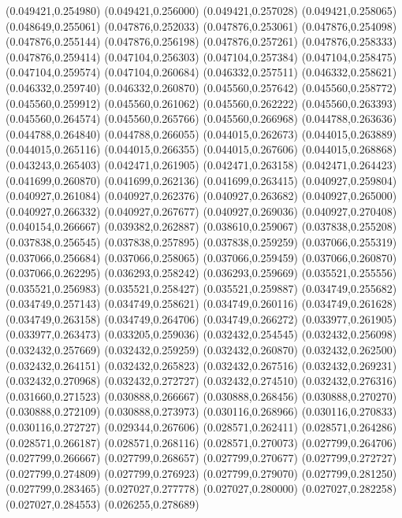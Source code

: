 (0.049421,0.254980)
(0.049421,0.256000)
(0.049421,0.257028)
(0.049421,0.258065)
(0.048649,0.255061)
(0.047876,0.252033)
(0.047876,0.253061)
(0.047876,0.254098)
(0.047876,0.255144)
(0.047876,0.256198)
(0.047876,0.257261)
(0.047876,0.258333)
(0.047876,0.259414)
(0.047104,0.256303)
(0.047104,0.257384)
(0.047104,0.258475)
(0.047104,0.259574)
(0.047104,0.260684)
(0.046332,0.257511)
(0.046332,0.258621)
(0.046332,0.259740)
(0.046332,0.260870)
(0.045560,0.257642)
(0.045560,0.258772)
(0.045560,0.259912)
(0.045560,0.261062)
(0.045560,0.262222)
(0.045560,0.263393)
(0.045560,0.264574)
(0.045560,0.265766)
(0.045560,0.266968)
(0.044788,0.263636)
(0.044788,0.264840)
(0.044788,0.266055)
(0.044015,0.262673)
(0.044015,0.263889)
(0.044015,0.265116)
(0.044015,0.266355)
(0.044015,0.267606)
(0.044015,0.268868)
(0.043243,0.265403)
(0.042471,0.261905)
(0.042471,0.263158)
(0.042471,0.264423)
(0.041699,0.260870)
(0.041699,0.262136)
(0.041699,0.263415)
(0.040927,0.259804)
(0.040927,0.261084)
(0.040927,0.262376)
(0.040927,0.263682)
(0.040927,0.265000)
(0.040927,0.266332)
(0.040927,0.267677)
(0.040927,0.269036)
(0.040927,0.270408)
(0.040154,0.266667)
(0.039382,0.262887)
(0.038610,0.259067)
(0.037838,0.255208)
(0.037838,0.256545)
(0.037838,0.257895)
(0.037838,0.259259)
(0.037066,0.255319)
(0.037066,0.256684)
(0.037066,0.258065)
(0.037066,0.259459)
(0.037066,0.260870)
(0.037066,0.262295)
(0.036293,0.258242)
(0.036293,0.259669)
(0.035521,0.255556)
(0.035521,0.256983)
(0.035521,0.258427)
(0.035521,0.259887)
(0.034749,0.255682)
(0.034749,0.257143)
(0.034749,0.258621)
(0.034749,0.260116)
(0.034749,0.261628)
(0.034749,0.263158)
(0.034749,0.264706)
(0.034749,0.266272)
(0.033977,0.261905)
(0.033977,0.263473)
(0.033205,0.259036)
(0.032432,0.254545)
(0.032432,0.256098)
(0.032432,0.257669)
(0.032432,0.259259)
(0.032432,0.260870)
(0.032432,0.262500)
(0.032432,0.264151)
(0.032432,0.265823)
(0.032432,0.267516)
(0.032432,0.269231)
(0.032432,0.270968)
(0.032432,0.272727)
(0.032432,0.274510)
(0.032432,0.276316)
(0.031660,0.271523)
(0.030888,0.266667)
(0.030888,0.268456)
(0.030888,0.270270)
(0.030888,0.272109)
(0.030888,0.273973)
(0.030116,0.268966)
(0.030116,0.270833)
(0.030116,0.272727)
(0.029344,0.267606)
(0.028571,0.262411)
(0.028571,0.264286)
(0.028571,0.266187)
(0.028571,0.268116)
(0.028571,0.270073)
(0.027799,0.264706)
(0.027799,0.266667)
(0.027799,0.268657)
(0.027799,0.270677)
(0.027799,0.272727)
(0.027799,0.274809)
(0.027799,0.276923)
(0.027799,0.279070)
(0.027799,0.281250)
(0.027799,0.283465)
(0.027027,0.277778)
(0.027027,0.280000)
(0.027027,0.282258)
(0.027027,0.284553)
(0.026255,0.278689)
